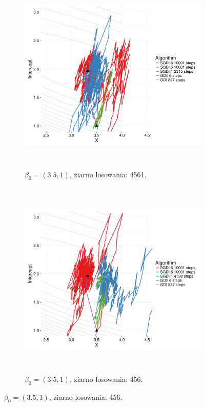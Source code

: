 \begin{figure}[hbt!]
  \begin{center}
   \begin{subfigure}[h!]{0.9\textwidth}
      \includegraphics[width=\textwidth, height=270pt]{Obrazki/Numeryka/sgd_35_1_1.pdf}
      \caption{$\beta_0 = (3.5,1)$, ziarno losowania: 4561.}
   \end{subfigure}     
   \begin{subfigure}[h!]{0.9\textwidth}
      \includegraphics[width=\textwidth, height=270pt]{Obrazki/Numeryka/sgd_35_1_2.pdf}
      \caption{$\beta_0 = (3.5,1)$, ziarno losowania: 456.}
   \end{subfigure}  \end{center}

\end{figure}
